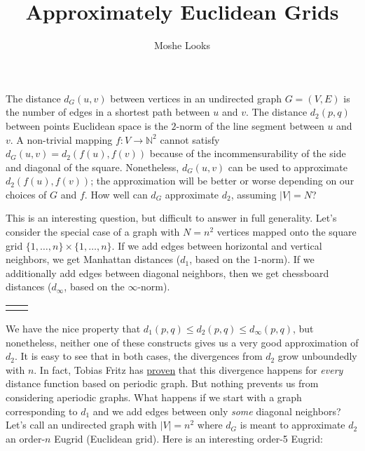 \documentclass[letterpaper]{article}
\begin{document}
\title{Approximately Euclidean Grids}
\author{Moshe Looks}

\maketitle

The distance $d_G(u, v)$ between vertices in an undirected graph $G = (V, E)$ is the number
of edges in a shortest path between $u$ and $v$. The distance $d_2(p, q)$ between points
Euclidean space is the $2$-norm of the line segment between $u$ and $v$. A non-trivial
mapping $f : V \to \mathbb{N}^2$ cannot satisfy $d_G(u, v) = d_2(f(u), f(v))$ because of the
incommensurability of the side and diagonal of the square. Nonetheless, $d_G(u, v)$ can be
used to approximate $d_2(f(u), f(v))$; the approximation will be better or worse depending on
our choices of $G$ and $f$. How well can $d_G$ approximate $d_2$, assuming $|V| = N$?

This is an interesting question, but difficult to answer in full generality. Let's consider
the special case of a graph with $N = n^2$ vertices mapped onto the square grid $\{1, \ldots,
n\} \times \{1, \ldots, n\}$. If we add edges between horizontal and vertical neighbors, we
get Manhattan distances ($d_1$, based on the $1$-norm). If we additionally add edges between
diagonal neighbors, then we get chessboard distances ($d_\infty$, based on
the $\infty$-norm).

\setlength{\tabcolsep}{15pt}
\begin{tabular}{ l r}
   & 
\end{tabular}

We have the nice property that $d_1(p, q) \leq d_2(p, q) \leq d_\infty(p, q)$, but
nonetheless, neither one of these constructs gives us a very good approximation of $d_2$. It
is easy to see that in both cases, the divergences from $d_2$ grow unboundedly with $n$.  In
fact, Tobias Fritz has \href{https://arxiv.org/abs/1109.1963}{proven} that this divergence
happens for \emph{every} distance function based on periodic graph. But nothing prevents us
from considering aperiodic graphs. What happens if we start with a graph corresponding to
$d_1$ and we add edges between only \emph{some} diagonal neighbors? Let's call an undirected
graph with $|V| = n^2$ where $d_G$ is meant to approximate $d_2$ an order-$n$ Eugrid
(Euclidean grid). Here is an interesting order-5 Eugrid:

\begin{center}
  
\end{center}
\end{document}

